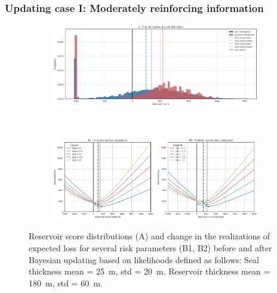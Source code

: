 				\subsubsection{Updating case I: Moderately reinforcing information}
				\begin{figure}[h]
					\begin{subfigure}{1\textwidth}
						\centering
						\includegraphics[width=1\linewidth]{Figures/update_moderate2.png}
					\end{subfigure}%
					\\
					\begin{subfigure}{1\textwidth}
						\centering
						\includegraphics[width=1\linewidth]{Figures/update_moderate3.png}
					\end{subfigure}
					\caption{Reservoir score distributions (A) and change in the realizations of expected loss for several risk parameters (B1, B2) before and after Bayesian updating based on likelihoods defined as follows: Seal thickness mean = 25~m, std = 20~m. Reservoir thickness mean = 180~m, std = 60~m.}
					\label{fig:update_moderate2_3}
				\end{figure}
				
